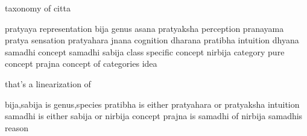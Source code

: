 taxonomy of citta

pratyaya          representation
bija              genus               asana
pratyaksha        perception          pranayama
pratya            sensation           pratyahara
jnana             cognition           dharana
pratibha          intuition           dhyana
samadhi           concept             samadhi
sabija            class               specific concept
nirbija           category            pure concept
prajna            concept of categories  idea

that's a linearization of

bija,sabija is genus,species
pratibha is either pratyahara or pratyaksha    intuition
samadhi is either sabija or nirbija            concept
prajna is samadhi of nirbija samadhis          reason
